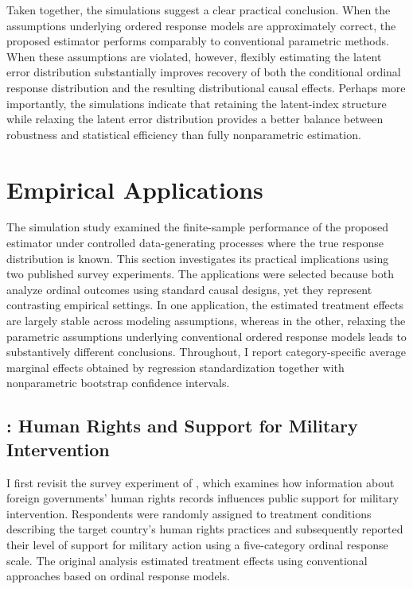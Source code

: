 \documentclass{article}
\begin{document}
Taken together, the simulations suggest a clear practical conclusion. When the assumptions underlying ordered response models are approximately correct, the proposed estimator performs comparably to conventional parametric methods. When these assumptions are violated, however, flexibly estimating the latent error distribution substantially improves recovery of both the conditional ordinal response distribution and the resulting distributional causal effects. Perhaps more importantly, the simulations indicate that retaining the latent-index structure while relaxing the latent error distribution provides a better balance between robustness and statistical efficiency than fully nonparametric estimation.

\section{Empirical Applications}
\label{sec:application}

The simulation study examined the finite-sample performance of the proposed estimator under controlled data-generating processes where the true response distribution is known. This section investigates its practical implications using two published survey experiments. The applications were selected because both analyze ordinal outcomes using standard causal designs, yet they represent contrasting empirical settings. In one application, the estimated treatment effects are largely stable across modeling assumptions, whereas in the other, relaxing the parametric assumptions underlying conventional ordered response models leads to substantively different conclusions. Throughout, I report category-specific average marginal effects obtained by regression standardization together with nonparametric bootstrap confidence intervals.

\subsection{\citet{Tomz2020a}: Human Rights and Support for Military Intervention}
\label{subsec:tomz}

I first revisit the survey experiment of \citet{Tomz2020a}, which examines how information about foreign governments’ human rights records influences public support for military intervention. Respondents were randomly assigned to treatment conditions describing the target country’s human rights practices and subsequently reported their level of support for military action using a five-category ordinal response scale. The original analysis estimated treatment effects using conventional approaches based on ordinal response models.
\end{document}
